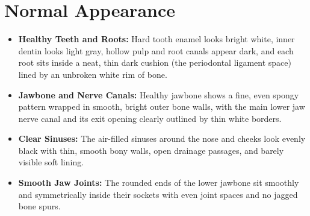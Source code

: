 \section{Normal Appearance}
\begin{itemize}
    \item \textbf{Healthy Teeth and Roots:} Hard tooth enamel looks bright white, inner dentin looks light gray, hollow pulp and root canals appear dark, and each root sits inside a neat, thin dark cushion (the periodontal ligament space) lined by an unbroken white rim of bone.
    \item \textbf{Jawbone and Nerve Canals:} Healthy jawbone shows a fine, even spongy pattern wrapped in smooth, bright outer bone walls, with the main lower jaw nerve canal and its exit opening clearly outlined by thin white borders.
    \item \textbf{Clear Sinuses:} The air-filled sinuses around the nose and cheeks look evenly black with thin, smooth bony walls, open drainage passages, and barely visible soft lining.
    \item \textbf{Smooth Jaw Joints:} The rounded ends of the lower jawbone sit smoothly and symmetrically inside their sockets with even joint spaces and no jagged bone spurs.
\end{itemize}

